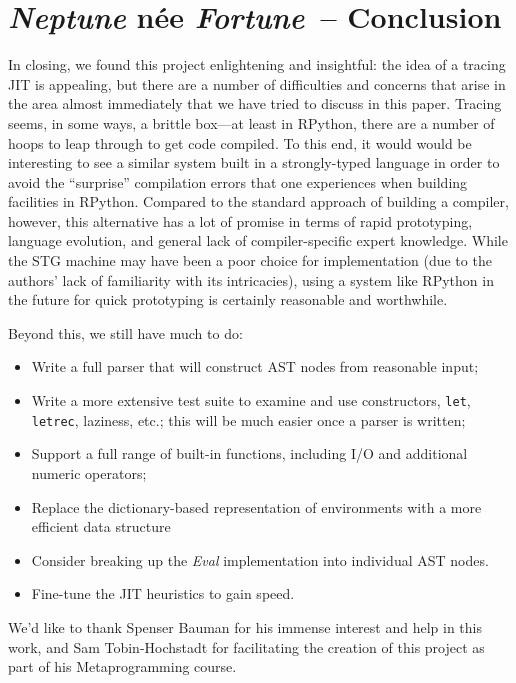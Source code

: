 \documentclass[preprint]{sigplanconf}
\begin{document}
\section{\emph{Neptune} n\'{e}e \emph{Fortune}~-- Conclusion} %

In closing, we found this project enlightening and insightful: the idea of a 
tracing JIT is appealing, but there are a number of difficulties and concerns
that arise in the area almost immediately that we have tried to discuss in this
paper. Tracing seems, in some ways, a brittle box---at least in RPython, there
are a number of hoops to leap through to get code compiled. To this end,
it would would be interesting to see a similar system built in a strongly-typed
language in order to avoid the ``surprise'' compilation errors that one
experiences when building facilities in RPython. Compared to the standard
approach of building a compiler, however, this alternative has a lot of promise
in terms of rapid prototyping, language evolution, and general lack of
compiler-specific expert knowledge. While the STG machine may have been a poor
choice for implementation (due to the authors' lack of familiarity with its
intricacies), using a system like RPython in the future for quick prototyping
is certainly reasonable and worthwhile.

Beyond this, we still have much to do:
\begin{itemize}
\item Write a full parser that will construct AST nodes from reasonable input;
\item Write a more extensive test suite to examine and use constructors,
      \lstinline{let}, \lstinline{letrec}, laziness, etc.; this will be much
      easier once a parser is written;
\item Support a full range of built-in functions, including I/O and additional
      numeric operators;
\item Replace the dictionary-based representation of environments with a
      more efficient data structure
\item Consider breaking up the \textit{Eval} implementation into individual
      AST nodes.
\item Fine-tune the JIT heuristics to gain speed.
\end{itemize}


\acks

We'd like to thank Spenser Bauman for his immense interest and help
in this work, and Sam Tobin-Hochstadt for facilitating the creation
of this project as part of his Metaprogramming course.





\softraggedright


\end{document}
